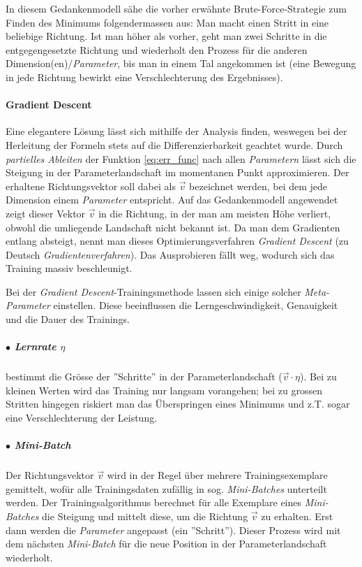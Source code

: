 In diesem Gedankenmodell sähe die vorher erwähnte Brute-Force-Strategie zum Finden des Minimums folgendermassen aus: Man macht einen Stritt in eine beliebige Richtung. Ist man höher als vorher, geht man zwei Schritte in die entgegengesetzte Richtung und wiederholt den Prozess für die anderen Dimension(en)/\textit{Parameter}, bis man in einem Tal angekommen ist (eine Bewegung in jede Richtung bewirkt eine Verschlechterung des Ergebnisses).

\paragraph{Gradient Descent}\label{cha:theo:backprop:gd} Eine elegantere Lösung lässt sich mithilfe der Analysis finden, weswegen bei der Herleitung der Formeln stets auf die Differenzierbarkeit geachtet wurde. Durch \textit{partielles Ableiten} der Funktion \ref{eq:err_func} nach allen \textit{Parametern} lässt sich die Steigung in der Parameterlandschaft im momentanen Punkt approximieren. Der erhaltene Richtungsvektor soll dabei als $\vec{v}$ bezeichnet werden, bei dem jede Dimension einem \textit{Parameter} entspricht. Auf das Gedankenmodell angewendet zeigt dieser Vektor $\vec{v}$ in die Richtung, in der man am meisten Höhe verliert, obwohl die umliegende Landschaft nicht bekannt ist. Da man dem Gradienten entlang absteigt, nennt man dieses Optimierungsverfahren \textit{Gradient Descent} (zu Deutsch \textit{Gradientenverfahren}). Das Ausprobieren fällt weg, wodurch sich das Training massiv beschleunigt.

Bei der \textit{Gradient Descent}-Trainingsmethode lassen sich einige solcher \textit{Meta-Parameter} einstellen. Diese beeinflussen die Lerngeschwindigkeit, Genauigkeit und die Dauer des Trainings.

\subparagraph{$\bullet$ Lernrate $\eta$} bestimmt die Grösse der ''Schritte'' in der Parameterlandschaft ($\vec{v} \cdot \eta$). Bei zu kleinen Werten wird das Training nur langsam vorangehen; bei zu grossen Stritten hingegen riskiert man das Überspringen eines Minimums und z.T. sogar eine Verschlechterung der Leistung. 

\subparagraph{$\bullet$ Mini-Batch} Der Richtungsvektor $\vec{v}$ wird in der Regel über mehrere Trainingsexemplare gemittelt, wofür alle Trainingsdaten zufällig in sog. \textit{Mini-Batches} unterteilt werden. Der Trainingsalgorithmus berechnet für alle Exemplare eines \textit{Mini-Batches} die Steigung und mittelt diese, um die Richtung $\vec{v}$ zu erhalten. Erst dann werden die \textit{Parameter} angepasst (ein ''Schritt''). Dieser Prozess wird mit dem nächsten \textit{Mini-Batch} für die neue Position in der Parameterlandschaft wiederholt.

